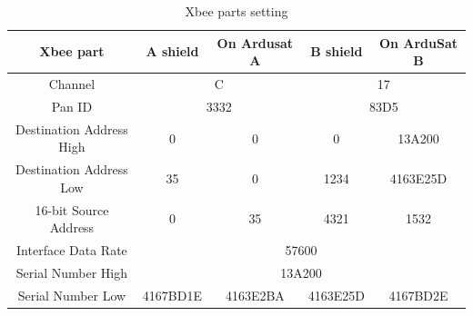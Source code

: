 \begin{table}[h!]
\renewcommand\arraystretch{2}
	\begin{center}
	\caption{Xbee parts setting}
	\begin{tabular}{|c|c|c|c|c|}
	\hline
	\textbf{Xbee part} & \textbf{A shield} & \textbf{On Ardusat A} & \textbf{B shield} & \textbf{On ArduSat B}\\ \hline
	Channel & \multicolumn{2}{c|}{C} &\multicolumn{2}{c|}{17}  \\ \hline
	Pan ID & \multicolumn{2}{c|}{3332}& \multicolumn{2}{c|}{83D5}\\ \hline
	Destination Address High & 0 & 0 & 0 & 13A200\\ \hline
	Destination Address Low & 35 & 0 & 1234&4163E25D\\ \hline
	16-bit Source Address & 0 & 35 & 4321 & 1532\\ \hline
	Interface Data Rate	 & \multicolumn{4}{c|}{57600}\\ \hline
	Serial Number High & \multicolumn{4}{c|}{13A200}\\ \hline
	Serial Number Low & 4167BD1E & 4163E2BA & 4163E25D & 4167BD2E\\ \hline
	\end{tabular}	
	\end{center}
\end{table}


\newpage